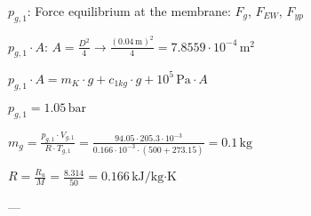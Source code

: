 \( p_{g,1} \):  
Force equilibrium at the membrane:  
\( F_g \), \( F_{EW} \), \( F_{yp} \)  

\( p_{g,1} \cdot A \):  
\( A = \frac{D^2}{4} \rightarrow \frac{(0.04 \, \text{m})^2}{4} = 7.8559 \cdot 10^{-4} \, \text{m}^2 \)  

\( p_{g,1} \cdot A = m_K \cdot g + c_{1kg} \cdot g + 10^5 \, \text{Pa} \cdot A \)  

\( p_{g,1} = 1.05 \, \text{bar} \)  

\( m_g = \frac{p_{g,1} \cdot V_{g,1}}{R \cdot T_{g,1}} = \frac{94.05 \cdot 205.3 \cdot 10^{-3}}{0.166 \cdot 10^{-3} \cdot (500 + 273.15)} = 0.1 \, \text{kg} \)  

\( R = \frac{R_u}{M} = \frac{8.314}{50} = 0.166 \, \text{kJ/kg·K} \)  

---